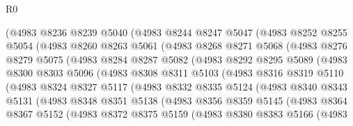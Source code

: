 \begin{lexlean}{R0}
\begin{coremodule}
        (@4983
          @8236
          @8239
          @5040
          (@4983
            @8244
            @8247
            @5047
            (@4983
              @8252
              @8255
              @5054
              (@4983
                @8260
                @8263
                @5061
                (@4983
                  @8268
                  @8271
                  @5068
                  (@4983
                    @8276
                    @8279
                    @5075
                    (@4983
                      @8284
                      @8287
                      @5082
                      (@4983
                        @8292
                        @8295
                        @5089
                        (@4983
                          @8300
                          @8303
                          @5096
                          (@4983
                            @8308
                            @8311
                            @5103
                            (@4983
                              @8316
                              @8319
                              @5110
                              (@4983
                                @8324
                                @8327
                                @5117
                                (@4983
                                  @8332
                                  @8335
                                  @5124
                                  (@4983
                                    @8340
                                    @8343
                                    @5131
                                    (@4983
                                      @8348
                                      @8351
                                      @5138
                                      (@4983
                                        @8356
                                        @8359
                                        @5145
                                        (@4983
                                          @8364
                                          @8367
                                          @5152
                                          (@4983
                                            @8372
                                            @8375
                                            @5159
                                            (@4983
                                              @8380
                                              @8383
                                              @5166
                                              (@4983

\end{coremodule}
\end{lexlean}
